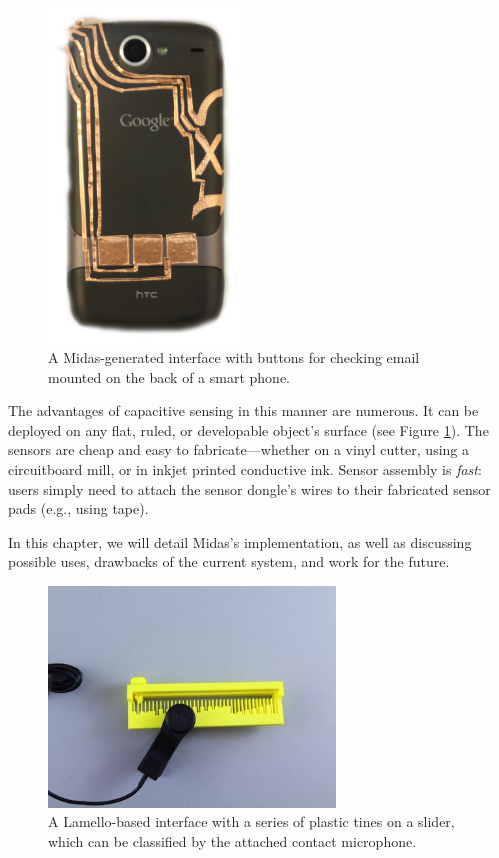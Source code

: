 \begin{figure}
\centering
\includegraphics[width=2in]{figures/midas/midas-intro.jpg}
\caption{A Midas-generated interface with buttons for checking email mounted on the back of a smart phone.}
\label{fig:midas-intro}
\end{figure}

The advantages of capacitive sensing in this manner are numerous. It can be deployed on any flat, ruled, or developable object's surface (see Figure \ref{fig:midas-intro}). The sensors are cheap and easy to fabricate---whether on a vinyl cutter, using a circuitboard mill, or in inkjet printed conductive ink. Sensor assembly is \emph{fast}: users simply need to attach the sensor dongle's wires to their fabricated sensor pads (e.g., using tape).

In this chapter, we will detail Midas's implementation, as well as discussing possible uses, drawbacks of the current system, and work for the future.

\begin{figure}
\centering
\includegraphics[width=3in]{figures/lamello/lamello-intro.jpeg}
\caption{A Lamello-based interface with a series of plastic tines on a slider, which can be classified by the attached contact microphone.}
\label{fig:lamello-intro}
\end{figure}

